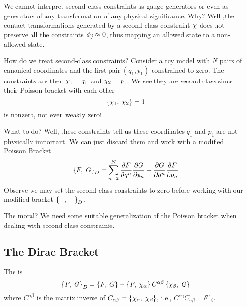\M
We cannot interpret second-class constraints as gauge generators or even
as generators of any transformation of any physical significance. Why?
Well ,the contact transformations generated by a second-class constraint
$\chi$ does not preserve all the constraints
$\phi_{j}\approx0$, thus mapping an allowed state to a non-allowed
state.

\M
How do we treat second-class constraints? Consider a toy model with $N$
pairs of canonical coordinates and the first pair $(q_{1}, p_{1})$
constrained to zero. The constraints are then
$\chi_{1}=q_{1}$ and
$\chi_{2}=p_{1}$. We see they are second class since
their Poisson bracket with each other
\begin{equation}
\left\{\chi_{1},\;\chi_{2}\right\}=1
\end{equation}
is nonzero, not even weakly zero!

What to do? Well, these constraints tell us these coordinates $q_{1}$
and $p_{1}$ are not physically important. We can just discard them and
work with a modified Poisson Bracket
\begin{equation}
\left\{F,\;G\right\}_{D} = \sum_{n=2}^{N}\frac{\partial F}{\partial
q^{n}}\frac{\partial G}{\partial p_{n}}
-\frac{\partial G}{\partial q^{n}}\frac{\partial F}{\partial p_{n}}
\end{equation}
Observe we may set the second-class constraints to zero
before working with our modified bracket $\left\{-,\;-\right\}_{D}$. 

The moral? We need some suitable generalization of the Poisson bracket
when dealing with second-class constraints.

\subsection{The Dirac Bracket}

\begin{definition}
The  is
\begin{equation}
\left\{F,\;G\right\}_{D} = \left\{F,\;G\right\} - \left\{F,\;\chi_{\alpha}\right\}C^{\alpha\beta}\left\{\chi_{\beta},\;G\right\}
\end{equation}
where $C^{\alpha\beta}$ is the matrix inverse of
$C_{\alpha\beta}=\left\{\chi_{\alpha},\;\chi_{\beta}\right\}$,
i.e., $C^{\alpha\gamma}C_{\gamma\beta}={\delta^{\alpha}}_{\beta}$.
\end{definition}

